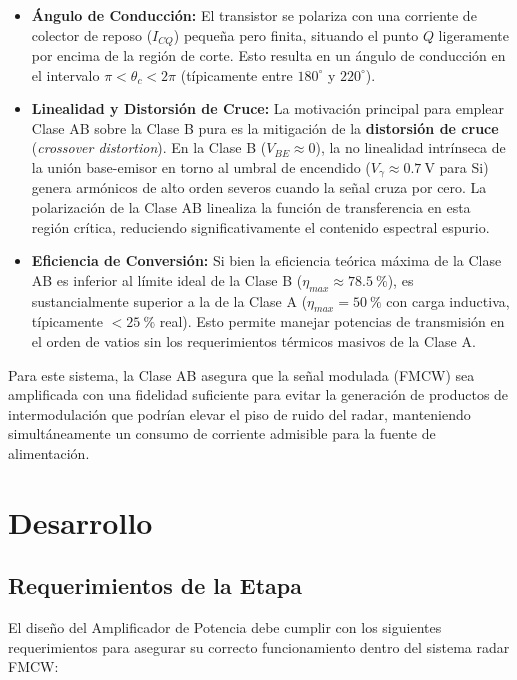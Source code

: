 \begin{itemize}
    \item \textbf{Ángulo de Conducción:} 
    El transistor se polariza con una corriente de colector de reposo ($I_{CQ}$) pequeña pero finita, situando el punto $Q$ ligeramente por encima de la región de corte. Esto resulta en un ángulo de conducción en el intervalo $\pi < \theta_c < 2\pi$ (típicamente entre $180^\circ$ y $220^\circ$).
    
    \item \textbf{Linealidad y Distorsión de Cruce:} 
    La motivación principal para emplear Clase AB sobre la Clase B pura es la mitigación de la \textbf{distorsión de cruce} (\textit{crossover distortion}). En la Clase B ($V_{BE} \approx 0$), la no linealidad intrínseca de la unión base-emisor en torno al umbral de encendido ($V_\gamma \approx \qty{0,7}{\V}$ para Si) genera armónicos de alto orden severos cuando la señal cruza por cero. La polarización de la Clase AB linealiza la función de transferencia en esta región crítica, reduciendo significativamente el contenido espectral espurio.

    \item \textbf{Eficiencia de Conversión:} 
    Si bien la eficiencia teórica máxima de la Clase AB es inferior al límite ideal de la Clase B ($\eta_{max} \approx \qty{78,5}{\percent}$), es sustancialmente superior a la de la Clase A ($\eta_{max} = \qty{50}{\percent}$ con carga inductiva, típicamente $<\qty{25}{\percent}$ real). Esto permite manejar potencias de transmisión en el orden de vatios sin los requerimientos térmicos masivos de la Clase A.
\end{itemize}

Para este sistema, la Clase AB asegura que la señal modulada (FMCW) sea amplificada con una fidelidad suficiente para evitar la generación de productos de intermodulación que podrían elevar el piso de ruido del radar, manteniendo simultáneamente un consumo de corriente admisible para la fuente de alimentación.

\section{Desarrollo}

\subsection{Requerimientos de la Etapa}

El diseño del Amplificador de Potencia debe cumplir con los siguientes requerimientos para asegurar su correcto funcionamiento dentro del sistema radar FMCW:

